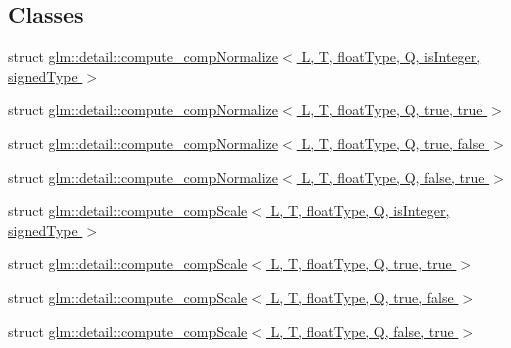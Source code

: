 \subsection*{Classes}
\begin{DoxyCompactItemize}
\item 
struct \hyperlink{structglm_1_1detail_1_1compute__compNormalize}{glm\+::detail\+::compute\+\_\+comp\+Normalize$<$ L, T, float\+Type, Q, is\+Integer, signed\+Type $>$}
\item 
struct \hyperlink{structglm_1_1detail_1_1compute__compNormalize_3_01L_00_01T_00_01floatType_00_01Q_00_01true_00_01true_01_4}{glm\+::detail\+::compute\+\_\+comp\+Normalize$<$ L, T, float\+Type, Q, true, true $>$}
\item 
struct \hyperlink{structglm_1_1detail_1_1compute__compNormalize_3_01L_00_01T_00_01floatType_00_01Q_00_01true_00_01false_01_4}{glm\+::detail\+::compute\+\_\+comp\+Normalize$<$ L, T, float\+Type, Q, true, false $>$}
\item 
struct \hyperlink{structglm_1_1detail_1_1compute__compNormalize_3_01L_00_01T_00_01floatType_00_01Q_00_01false_00_01true_01_4}{glm\+::detail\+::compute\+\_\+comp\+Normalize$<$ L, T, float\+Type, Q, false, true $>$}
\item 
struct \hyperlink{structglm_1_1detail_1_1compute__compScale}{glm\+::detail\+::compute\+\_\+comp\+Scale$<$ L, T, float\+Type, Q, is\+Integer, signed\+Type $>$}
\item 
struct \hyperlink{structglm_1_1detail_1_1compute__compScale_3_01L_00_01T_00_01floatType_00_01Q_00_01true_00_01true_01_4}{glm\+::detail\+::compute\+\_\+comp\+Scale$<$ L, T, float\+Type, Q, true, true $>$}
\item 
struct \hyperlink{structglm_1_1detail_1_1compute__compScale_3_01L_00_01T_00_01floatType_00_01Q_00_01true_00_01false_01_4}{glm\+::detail\+::compute\+\_\+comp\+Scale$<$ L, T, float\+Type, Q, true, false $>$}
\item 
struct \hyperlink{structglm_1_1detail_1_1compute__compScale_3_01L_00_01T_00_01floatType_00_01Q_00_01false_00_01true_01_4}{glm\+::detail\+::compute\+\_\+comp\+Scale$<$ L, T, float\+Type, Q, false, true $>$}
\end{DoxyCompactItemize}
